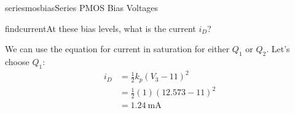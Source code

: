 \begin{mainquestion}{seriesmosbias}{Series PMOS Bias Voltages}
\begin{partquestion}{findcurrent}{At these bias levels, what is the current $i_{D}$?}
\begin{answer}
We can use the equation for current in saturation for either $Q_{1}$ or $Q_{2}$. Let's choose $Q_{1}$:
\begin{align*}
    i_D &= \frac{1}{2} k_p (V_3 - 11)^2 \\
    &= \frac{1}{2} (1) (12.573 - 11)^2 \\
    &= \qty{1.24}{\milli\ampere}
\end{align*}
\end{answer}
\end{partquestion}

\end{mainquestion}
